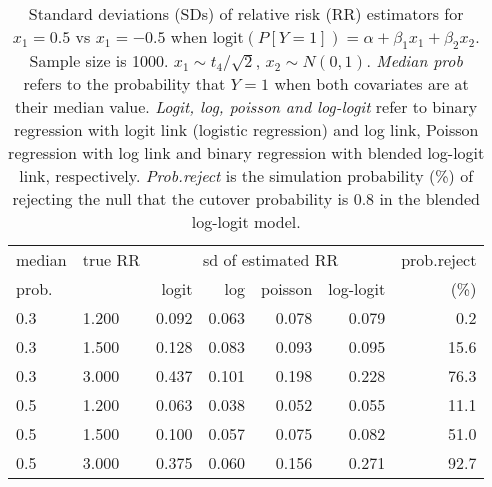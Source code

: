 \documentclass[12pt,a4paper]{article}
\begin{document}
\begin{table}[H] 
\small\sf\centering 
\caption{Standard deviations (SDs) of relative risk (RR) estimators for $x_1=0.5$ vs $x_1=-0.5$ when $\mbox{logit}(P[Y=1])=\alpha+\beta_1 x_1 + \beta_2 x_2$. Sample size is 1000. $x_1 \sim $$t_4/\sqrt{2}$, $x_2 \sim N(0,1)$. {\it Median prob} refers to the probability that $Y=1$ when both covariates are at their median value. {\it Logit, log, poisson and log-logit} refer to binary regression with logit link (logistic regression) and log link, Poisson regression with log link and binary regression with blended log-logit link, respectively. {\it Prob.reject} is the simulation probability (\%) of rejecting the null that the cutover probability is $0.8$ in the blended log-logit model.} 
\begin{tabular}{llrrrrr} 
\toprule 
median & true RR & \multicolumn{4}{c}{sd of estimated RR} & prob.reject \\ 
prob. & & logit & log & poisson & log-logit  & (\%) \\ \midrule 
0.3 & 1.200 & 0.092 & 0.063 & 0.078 & 0.079 &  0.2 \\  
0.3 & 1.500 & 0.128 & 0.083 & 0.093 & 0.095 & 15.6 \\  
0.3 & 3.000 & 0.437 & 0.101 & 0.198 & 0.228 & 76.3 \\  
0.5 & 1.200 & 0.063 & 0.038 & 0.052 & 0.055 & 11.1 \\  
0.5 & 1.500 & 0.100 & 0.057 & 0.075 & 0.082 & 51.0 \\  
0.5 & 3.000 & 0.375 & 0.060 & 0.156 & 0.271 & 92.7 \\  
\bottomrule 
\end{tabular} 
\end{table} 
\end{document}
